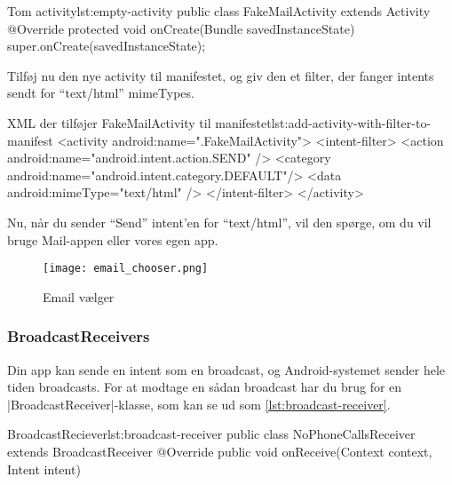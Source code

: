 \begin{example}\noindent
	\begin{JavaCode}{Tom activity}{lst:empty-activity}
		public class FakeMailActivity extends Activity {
			@Override
			protected void onCreate(Bundle savedInstanceState) {
				super.onCreate(savedInstanceState);
			}
		}
	\end{JavaCode}
\end{example}

Tilføj nu den nye activity til manifestet, og giv den et filter, der fanger intents sendt for ``text/html'' mimeTypes.

\begin{example}\noindent
	\begin{XmlCode}{XML der tilføjer FakeMailActivity til manifestet}{lst:add-activity-with-filter-to-manifest}
		<activity android:name=".FakeMailActivity">
			<intent-filter>
				<action android:name="android.intent.action.SEND" />
				<category android:name="android.intent.category.DEFAULT"/>
				<data android:mimeType="text/html" />
			</intent-filter>
		</activity>
	\end{XmlCode}
\end{example}

Nu, når du sender ``Send'' intent'en for ``text/html'', vil den spørge, om du vil bruge Mail-appen eller vores egen app.

\begin{figure}[h]
	\begin{center}
		\texttt{[image: email\_chooser.png]}
		\caption{Email vælger}
		\label{fig:android:activities:email_chooser}
	\end{center}
\end{figure}

\subsubsection{BroadcastReceivers}

Din app kan sende en intent som en broadcast, og Android-systemet sender hele tiden broadcasts. For at modtage en sådan broadcast har du brug for en \JavaInline|BroadcastReceiver|-klasse, som kan se ud som \autoref{lst:broadcast-receiver}.

\begin{example}\noindent
	\begin{JavaCode}{BroadcastReciever}{lst:broadcast-receiver}
		public class NoPhoneCallsReceiver extends BroadcastReceiver {
			@Override
			public void onReceive(Context context, Intent intent) {
			}
		}
	\end{JavaCode}
\end{example}

